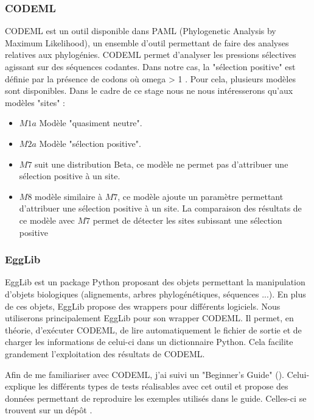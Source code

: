 \documentclass[../main]{subfiles} %
\begin{document}
\subsubsection{CODEML}
\label{sec:CODEML}
\gls{CODEML} est un outil disponible dans \gls{PAML} (Phylogenetic Analysis by Maximum Likelihood), un ensemble d'outil permettant de faire des analyses relatives aux \glspl{phylogénie}. \gls{CODEML} permet d'analyser les pressions sélectives agissant sur des séquences codantes. Dans notre cas, la "sélection positive" est définie par la présence de \glspl{codon} où \acrshort{omega} > 1  \cite{alvarez-carretero_beginners_2023}. Pour cela, plusieurs modèles sont disponibles. Dans le cadre de ce stage nous ne nous intéresserons qu'aux modèles "sites" :
\begin{itemize}
    \item $M1a$ Modèle "quasiment neutre".  \cite{alvarez-carretero_beginners_2023}
    \item $M2a$ Modèle "sélection positive". \cite{alvarez-carretero_beginners_2023}
    \item $M7$ suit une distribution Beta, ce modèle ne permet pas d'attribuer une sélection positive à un site. \cite{yang_codon-substitution_2000}
    \item $M8$ modèle similaire à $M7$, ce modèle ajoute un paramètre permettant d'attribuer une sélection positive à un site. La comparaison des résultats de ce modèle avec $M7$ permet de détecter les sites subissant une sélection positive \cite{yang_codon-substitution_2000}

\end{itemize}


\subsubsection{EggLib}
\label{sec:EggLib}
\gls{EggLib} est un package \gls{Python} proposant des objets permettant la manipulation d'objets biologiques (alignements, arbres phylogénétiques, séquences ...). En plus de ces objets, \gls{EggLib} propose des \glspl{wrapper} pour différents logiciels. Nous utiliserons principalement \gls{EggLib} pour son \gls{wrapper} \gls{CODEML}. Il permet, en théorie, d'exécuter \gls{CODEML}, de lire automatiquement le fichier de sortie et de charger les informations de celui-ci dans un dictionnaire \gls{Python}. Cela facilite grandement l'exploitation des résultats de \gls{CODEML}.

\label{sec:FamiCodeml}
Afin de me familiariser avec \gls{CODEML}, j'ai suivi un "Beginner's Guide" (\cite{alvarez-carretero_beginners_2023}). Celui-explique les différents types de tests réalisables avec cet outil et propose des données permettant de reproduire les exemples utilisés dans le guide. Celles-ci se trouvent sur un dépôt \GitHub \cite{noauthor_paml-tutorialpositive-selection_nodate}.
\end{document}
